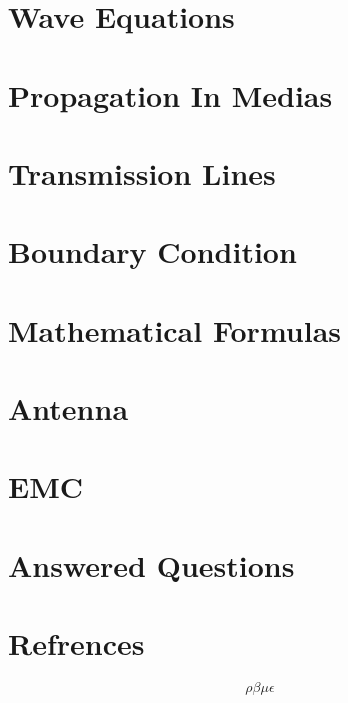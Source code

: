 \documentclass{article}
\begin{document}
\pagecolor{mainTheme}\afterpage{\pagecolor{backCirc}}
\maketitle
\thispagestyle{empty}


\section{Wave Equations}


\vspace{10pt}
\section{Propagation In Medias}


\section{Transmission Lines}


\section{Boundary Condition}




\vspace{10pt}
\section{Mathematical Formulas}


\vspace{10pt}
\section{Antenna}



\section{EMC}


\vspace{10pt}
\section{Answered Questions}


\section{Refrences}\vspace{0.5em}

$$ \rho \beta \mu \epsilon$$
\end{document}
